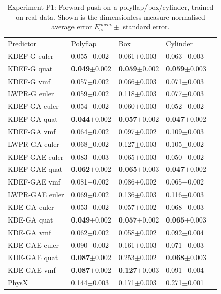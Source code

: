 \begin{table}[b]
\begin{center}
\begin{tabular}{|l|l|l|l|l|}
\cline{1-4}
Predictor & Polyflap & Box & Cylinder \\
\cline{1-4}
KDEF-G euler & 0.055$\pm$0.002 & 0.061$\pm$0.003 & 0.063$\pm$0.003\\
KDEF-G quat  & \textbf{0.049}$\pm$0.002 & \textbf{0.059}$\pm$0.002 & \textbf{0.059}$\pm$0.003\\
KDEF-G vmf   & 0.057$\pm$0.002 & 0.066$\pm$0.003 & 0.071$\pm$0.003\\
LWPR-G euler &  0.059$\pm$0.002 & 0.118$\pm$0.003 & 0.077$\pm$0.003\\
\cline{1-4}
KDEF-GA euler & 0.054$\pm$0.002 & 0.060$\pm$0.003 & 0.052$\pm$0.002\\
KDEF-GA quat & \textbf{0.044}$\pm$0.002 & \textbf{0.057}$\pm$0.002 & \textbf{0.047}$\pm$0.002\\
KDEF-GA vmf & 0.064$\pm$0.002 & 0.097$\pm$0.002  & 0.109$\pm$0.003 \\
LWPR-GA euler & 0.068$\pm$0.002 & 0.127$\pm$0.003 & 0.105$\pm$0.002 \\
\cline{1-4}
KDEF-GAE euler & 0.083$\pm$0.003 & 0.065$\pm$0.003 & 0.050$\pm$0.002 \\
KDEF-GAE quat & \textbf{0.062}$\pm$0.002 & \textbf{0.065}$\pm$0.003 & \textbf{0.047}$\pm$0.002\\
KDEF-GAE vmf & 0.081$\pm$0.002 & 0.086$\pm$0.002 & 0.065$\pm$0.002\\
LWPR-GAE euler & 0.069$\pm$0.002 & 0.136$\pm$0.003 & 0.116$\pm$0.003\\
\cline{1-4}
KDE-GA euler & 0.053$\pm$0.002 & 0.057$\pm$0.002 & 0.068$\pm$0.003 \\
KDE-GA quat  & \textbf{0.049}$\pm$0.002 & \textbf{0.057}$\pm$0.002 & \textbf{0.065}$\pm$0.003\\
KDE-GA vmf   & 0.062$\pm$0.002 & 0.058$\pm$0.002 & 0.092$\pm$0.004\\
\cline{1-4}
KDE-GAE euler & 0.090$\pm$0.002 & 0.161$\pm$0.003 & 0.071$\pm$0.003\\
KDE-GAE quat  & \textbf{0.087}$\pm$0.002 & 0.253$\pm$0.002 & \textbf{0.068}$\pm$0.003\\
KDE-GAE vmf   & \textbf{0.087}$\pm$0.002 & \textbf{0.127}$\pm$0.003 & 0.091$\pm$0.004\\
\cline{1-4}
PhysX & 0.144$\pm$0.003 &  0.171$\pm$0.003 & 0.271$\pm$0.001\\
\cline{1-4}
\end{tabular}
\end{center}
\caption[Performance Table]{Experiment P1: Forward push on a
  polyflap/box/cylinder, trained on real data. Shown is the dimensionless measure normalised average error  ${E_{av}^{norm}} \pm$ standard error.
}\label{tab:PerformanceTableL1av}
\end{table}

